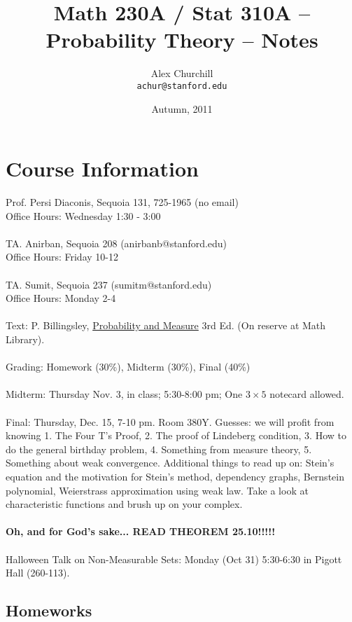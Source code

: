 \documentclass[12pt]{article}
\title{Math 230A / Stat 310A -- Probability Theory -- Notes}
\author{
Alex Churchill\\
\small \texttt{achur@stanford.edu}
}
\date{Autumn, 2011}
\begin{document}
\maketitle
\thispagestyle{empty} %
\tableofcontents


\newpage

\setcounter{page}{1} %

\section{Course Information}
Prof. Persi Diaconis, Sequoia 131, 725-1965 (no email) \\
Office Hours: Wednesday 1:30 - 3:00
\\ \\
TA. Anirban, Sequoia 208 (anirbanb@stanford.edu) \\
Office Hours: Friday 10-12
\\ \\
TA. Sumit, Sequoia 237 (sumitm@stanford.edu) \\
Office Hours: Monday 2-4
\\ \\
Text: P. Billingsley, \underline{Probability and Measure} 3rd Ed. (On reserve at Math Library).
\\ \\
Grading: Homework (30\%), Midterm (30\%), Final (40\%)
\\ \\
Midterm: Thursday Nov. 3, in class; 5:30-8:00 pm; One $3 \times 5$ notecard allowed.
\\ \\
Final: Thursday, Dec. 15, 7-10 pm.  Room 380Y.  Guesses: we will profit from knowing 1. The Four T's Proof, 2. The proof of Lindeberg condition, 3. How to do the general birthday problem, 4. Something from measure theory, 5. Something about weak convergence.  Additional things to read up on: Stein's equation and the motivation for Stein's method, dependency graphs, Bernstein polynomial, Weierstrass approximation using weak law.  Take a look at characteristic functions and brush up on your complex.
\\ \\
{\bf Oh, and for God's sake... READ THEOREM 25.10!!!!!}
\\ \\
Halloween Talk on Non-Measurable Sets: Monday (Oct 31) 5:30-6:30 in Pigott Hall (260-113).

\subsection{Homeworks}
\end{document}

